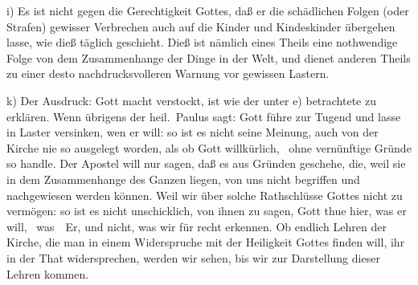 \begin{aufzb}
\item[i)] Es ist nicht gegen die Gerechtigkeit Gottes, daß er die schädlichen Folgen (oder Strafen) gewisser Verbrechen auch auf die Kinder und Kindeskinder übergehen lasse, wie dieß täglich geschieht. Dieß ist nämlich eines Theils eine nothwendige Folge von dem Zusammenhange der Dinge in der Welt, und dienet anderen Theils zu einer desto nachdrucksvolleren Warnung vor gewissen Lastern.
\item[k)] Der Ausdruck: Gott macht verstockt, ist wie der unter e) betrachtete zu erklären. Wenn übrigens der heil.\ Paulus sagt: Gott führe zur Tugend und lasse in Laster versinken, wen er will: so ist es nicht seine Meinung, auch von der Kirche nie so ausgelegt worden, als ob Gott willkürlich, \dh\ ohne vernünftige Gründe so handle. Der Apostel will nur sagen, daß es aus Gründen geschehe, die, weil sie in dem Zusammenhange des Ganzen liegen, von uns nicht begriffen und nachgewiesen werden können. Weil wir über solche Rathschlüsse Gottes nicht zu  vermögen: so ist es nicht unschicklich, von ihnen zu sagen, Gott thue hier, was er will, \dh\ was~\ Er, und nicht, was wir für recht erkennen. Ob endlich Lehren der Kirche, die man in einem Widerspruche mit der Heiligkeit Gottes finden will, ihr in der That widersprechen, werden wir sehen, bis wir zur Darstellung dieser Lehren kommen.
\end{aufzb}


